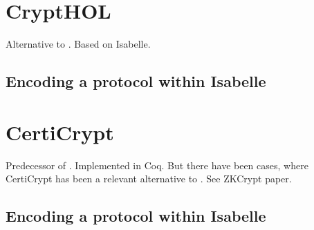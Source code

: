 \chapter{CryptHOL}
\label{ch:crypthol}
Alternative to \easycrypt. Based on Isabelle.


\section{Encoding a protocol within Isabelle}
\label{sec:protocol_in_isabelle}


\chapter{CertiCrypt}
\label{ch:certicrypt}
Predecessor of \easycrypt. Implemented in Coq. But there have been cases, where CertiCrypt has been
a relevant alternative to \easycrypt. See ZKCrypt paper.

\section{Encoding a protocol within Isabelle}
\label{sec:protocol_in_certicrypt}


